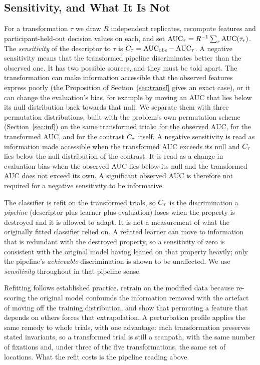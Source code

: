 \subsection{Sensitivity, and What It Is Not}\label{sec:stat}
For a transformation $\tau$ we draw $R$ independent replicates, recompute features and participant-held-out decision values on each, and set $\mathrm{AUC}_\tau = R^{-1}\sum_r \mathrm{AUC}(\tau_r)$. The \emph{sensitivity} of the descriptor to $\tau$ is $C_\tau = \mathrm{AUC}_{\mathrm{obs}} - \mathrm{AUC}_\tau$. A negative sensitivity means that the transformed pipeline discriminates better than the observed one. It has two possible sources, and they must be told apart. The transformation can make information accessible that the observed features express poorly (the Proposition of Section~\ref{sec:transf} gives an exact case), or it can change the evaluation's bias, for example by moving an AUC that lies below its null distribution back towards that null. We separate them with three permutation distributions, built with the problem's own permutation scheme (Section~\ref{sec:inf}) on the same transformed trials: for the observed AUC, for the transformed AUC, and for the contrast $C_\tau$ itself. A negative sensitivity is read as information made accessible when the transformed AUC exceeds its null and $C_\tau$ lies below the null distribution of the contrast. It is read as a change in evaluation bias when the observed AUC lies below its null and the transformed AUC does not exceed its own. A significant observed AUC is therefore not required for a negative sensitivity to be informative.

The classifier is refit on the transformed trials, so $C_\tau$ is the discrimination a \emph{pipeline} (descriptor plus learner plus evaluation) loses when the property is destroyed and it is allowed to adapt. It is not a measurement of what the originally fitted classifier relied on. A refitted learner can move to information that is redundant with the destroyed property, so a sensitivity of zero is consistent with the original model having leaned on that property heavily; only the pipeline's \emph{achievable} discrimination is shown to be unaffected. We use \emph{sensitivity} throughout in that pipeline sense.

Refitting follows established practice. \citet{hooker2019benchmark} retrain on the modified data because re-scoring the original model confounds the information removed with the artefact of moving off the training distribution, and \citet{hooker2021unrestricted} show that permuting a feature that depends on others forces that extrapolation. A perturbation profile applies the same remedy to whole trials, with one advantage: each transformation preserves stated invariants, so a transformed trial is still a scanpath, with the same number of fixations and, under three of the five transformations, the same set of locations. What the refit costs is the pipeline reading above.

